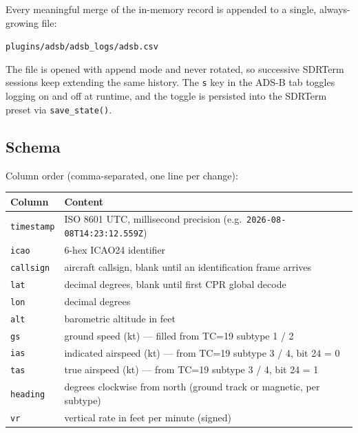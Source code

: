 \documentclass[11pt,a4paper]{article}
\begin{document}
Every meaningful merge of the in-memory record is appended to a
single, always-growing file:

\begin{center}
\texttt{plugins/adsb/adsb\_logs/adsb.csv}
\end{center}

The file is opened with append mode and never rotated, so successive
SDRTerm sessions keep extending the same history.  The \texttt{s} key
in the ADS-B tab toggles logging on and off at runtime, and the toggle
is persisted into the SDRTerm preset via \texttt{save\_state()}.

\subsection{Schema}

Column order (comma-separated, one line per change):

\begin{center}
\begin{tabular}{l l}
\toprule
Column & Content \\
\midrule
\texttt{timestamp} & ISO 8601 UTC, millisecond precision (e.g.\ \texttt{2026-08-08T14:23:12.559Z}) \\
\texttt{icao}      & 6-hex ICAO24 identifier                                                    \\
\texttt{callsign}  & aircraft callsign, blank until an identification frame arrives             \\
\texttt{lat}       & decimal degrees, blank until first CPR global decode                       \\
\texttt{lon}       & decimal degrees                                                            \\
\texttt{alt}       & barometric altitude in feet                                                \\
\texttt{gs}        & ground speed (kt) --- filled from TC=19 subtype 1 / 2                      \\
\texttt{ias}       & indicated airspeed (kt) --- from TC=19 subtype 3 / 4, bit 24 = 0           \\
\texttt{tas}       & true airspeed (kt) --- from TC=19 subtype 3 / 4, bit 24 = 1                \\
\texttt{heading}   & degrees clockwise from north (ground track or magnetic, per subtype)       \\
\texttt{vr}        & vertical rate in feet per minute (signed)                                  \\
\bottomrule
\end{tabular}
\end{center}
\end{document}
